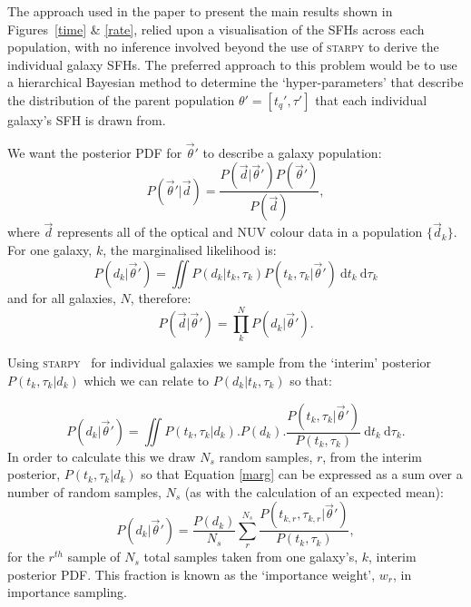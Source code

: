 \documentclass[useAMS,usenatbib]{mn2e}
\def\secondchange    {\color{srv} }
\begin{document}
{\secondchange The approach used in the paper to present the main results shown in Figures~\ref{time} \& \ref{rate}, relied upon a visualisation of the SFHs across each population, with no inference involved beyond the use of \textsc{starpy} to derive the individual galaxy SFHs. The preferred approach to this problem would be to use a hierarchical Bayesian method to determine the `hyper-parameters' that describe the distribution of the parent population $\theta' = [t_q', \tau']$ that each individual galaxy's SFH is drawn from. 

We want the posterior PDF for $\vec{\theta}'$ to describe a galaxy population:
\begin{equation}\label{hyper}
P(\vec{\theta}'|\vec{d}) = \frac{P(\vec{d}|\vec{\theta}')P(\vec{\theta}')}{P(\vec{d})}, 
\end{equation}
where $\vec{d}$ represents all of the optical and NUV colour data in a population $\{\vec{d}_k\}$. For one galaxy, $k$, the marginalised likelihood is:
\begin{equation}\label{one}
P(d_k|\vec{\theta}') = \iint \! P(d_k|t_k, \tau_k) P(t_k, \tau_k|\vec{\theta}') \ \mathrm{d}t_k ~ \mathrm{d}\tau_k
\end{equation}
and for all galaxies, $N$, therefore: 
\begin{equation}
P(\vec{d}|\vec{\theta}') = \prod_k^N P(d_k|\vec{\theta}').
\end{equation}

Using \textsc{starpy}~ for individual galaxies we sample from the `interim' posterior $P(t_k, \tau_k|d_k)$ which we can relate to $P(d_k|t_k, \tau_k)$  so that:

\begin{equation}\label{marg}
P(d_k|\vec{\theta}') = \iint  \! P(t_k, \tau_k|d_k) . P(d_k) . \frac{P(t_k, \tau_k|\vec{\theta}')}{P(t_k, \tau_k)} \ \mathrm{d}t_k ~ \mathrm{d}\tau_k.
\end{equation}
In order to calculate this we draw $N_s$ random samples, $r$, from the interim posterior, $P(t_k, \tau_k|d_k)$ so that Equation \ref{marg} can be expressed as a sum over a number of random samples, $N_s$ (as with the calculation of an expected mean):
\begin{equation}\label{imp}
P(d_k|\vec{\theta}') = \frac{P(d_k)}{N_s} \sum_r^{N_s} \frac{P(t_{k,r}, \tau_{k,r}|\vec{\theta}')}{P(t_k, \tau_k)},
\end{equation}
for the $r^{th}$ sample of $N_s$ total samples taken from one galaxy's, $k$,  interim posterior PDF. This fraction is known as the `importance weight', $w_r$, in importance sampling. 

}
\end{document}
